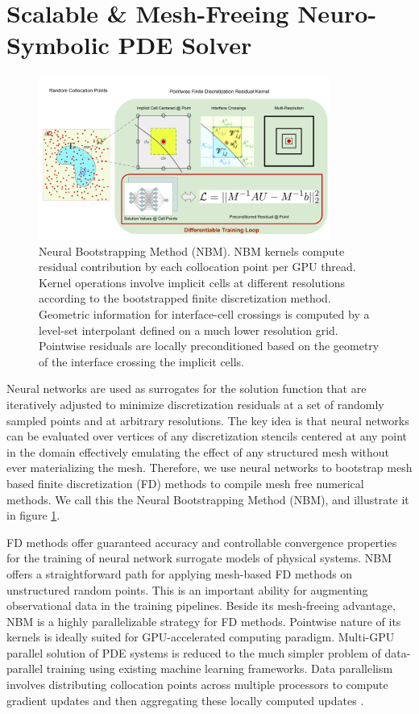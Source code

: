 \documentclass{article}
\begin{document}
\section{Scalable \& Mesh-Freeing Neuro-Symbolic PDE Solver}



\begin{figure}
\centering
\includegraphics[width=0.85\textwidth]{./figures/jax_dips_paper_v1_compact.png}
\caption{Neural Bootstrapping Method (NBM). NBM kernels compute residual contribution by each collocation point per GPU thread. Kernel operations involve implicit cells at different resolutions according to the bootstrapped finite discretization method. Geometric information for interface-cell crossings is computed by a level-set interpolant defined on a much lower resolution grid. Pointwise residuals are locally preconditioned based on the geometry of the interface crossing the implicit cells. }
\label{fig:nbm}
\end{figure}
Neural networks are used as surrogates for the solution function that are iteratively adjusted to minimize discretization residuals at a set of randomly sampled points and at arbitrary resolutions. The key idea is that neural networks can be evaluated over vertices of any discretization stencils centered at any point in the domain effectively emulating the effect of any structured mesh without ever materializing the mesh. Therefore, we use neural networks to bootstrap mesh based finite discretization (FD) methods to compile mesh free numerical methods. We call this the Neural Bootstrapping Method (NBM), and illustrate it in figure \ref{fig:nbm}. 

FD methods offer guaranteed accuracy and controllable convergence properties for the training of neural network surrogate models of physical systems. NBM offers a straightforward path for applying mesh-based FD methods on unstructured random points. This is an important ability for augmenting observational data in the training pipelines. Beside its mesh-freeing advantage, NBM is a highly parallelizable strategy for FD methods. Pointwise nature of its kernels is ideally suited for GPU-accelerated computing paradigm. Multi-GPU parallel solution of PDE systems is reduced to the much simpler problem of data-parallel training using existing machine learning frameworks. Data parallelism involves distributing collocation points across multiple processors to compute gradient updates and then aggregating these locally computed updates \cite{shallue2018measuring}.
\end{document}
